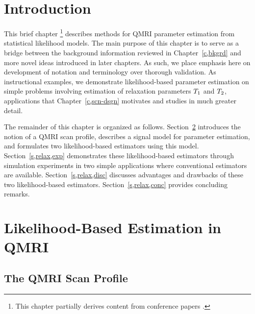 
\section{Introduction}
\label{s,relax,intro}

This brief chapter
\footnote{%
	This chapter partially derives content
	from conference papers
	\cite{nataraj:14:rje,nataraj:14:mbe}.
}
describes methods
for QMRI parameter estimation
from statistical likelihood models.
The main purpose of this chapter
is to serve as a bridge 
between the background information
reviewed in Chapter~\ref{c,bkgrd}
and more novel ideas 
introduced in later chapters.
As such, 
we place emphasis here
on development of notation and terminology
over thorough validation.
As instructional examples,
we demonstrate likelihood-based parameter estimation
on simple problems
involving estimation 
of relaxation parameters $T_1$ and $T_2$,
applications
that Chapter~\ref{c,scn-dsgn} motivates and studies 
in much greater detail.

The remainder of this chapter 
is organized as follows.
Section~\ref{s,relax,meth}
introduces the notion of a QMRI scan profile,
describes a signal model for parameter estimation,
and formulates two likelihood-based estimators
using this model.
Section~\ref{s,relax,exp}
demonstrates these likelihood-based estimators
through simulation experiments
in two simple applications
where conventional estimators are available.
Section~\ref{s,relax,disc} 
discusses advantages and drawbacks 
of these two likelihood-based estimators.
Section~\ref{s,relax,conc} 
provides concluding remarks.

\section{Likelihood-Based Estimation in QMRI}
\label{s,relax,meth}

\subsection{The QMRI Scan Profile}
\label{ss,relax,meth,prof}


